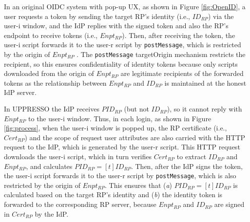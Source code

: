 In an original OIDC system with pop-up UX, as shown in Figure \ref{fig:OpenID},
    a user requests a token by sending the target RP's identity (i.e., $ID_{RP}$) via the user-i window,
    and the IdP replies with the signed token and also the RP's endpoint to receive tokens (i.e., $Enpt_{RP}$).
Then, after receiving the token, the user-i script forwards it to the user-r script by \verb+postMessage+,
    which is restricted by the origin of $Enpt_{RP}$ \cite{SPRESSO,MITREid,BrowserID,GoogleIdIntegrate,de2014oauth,OpenIDConnect}.
The \verb+postMessage+ targetOrigin mechanism \cite{postm-targeto} restricts the recipient,
so this ensures confidentiality of identity tokens because only scripts downloaded from the origin of $Enpt_{RP}$ are legitimate recipients of the forwarded tokens
    as the relationship between $Enpt_{RP}$ and $ID_{RP}$ is maintained at the honest IdP server.

In UPPRESSO the IdP receives $PID_{RP}$ (but not $ID_{RP}$),
    so it cannot reply with $Enpt_{RP}$ to the user-i window.
%
%
Thus, in each login, 
as shown in Figure \ref{fig:process},
when the user-i window is popped up,
    the RP certificate (i.e., $Cert_{RP}$) and the scope of request user attributes are also carried with the HTTP request to the IdP,
    which is generated by the user-r script.
This HTTP request downloads the user-i script,
    which in turn verifies $Cert_{RP}$ to extract $ID_{RP}$ and $Enpt_{RP}$, and calculates $PID_{RP} = [t]ID_{RP}$. %
Then, after the IdP signs the token,
    the user-i script forwards it to the user-r script by \verb+postMessage+,
    which is also restricted by the origin of $Enpt_{RP}$.
This ensures that (\emph{a}) $PID_{RP} = [t]{ID_{RP}}$ is calculated based on the target RP's identity and (\emph{b}) the identity token is forwarded to the corresponding RP server,
    because $Enpt_{RP}$ and $ID_{RP}$ are signed in $Cert_{RP}$ by the IdP.

